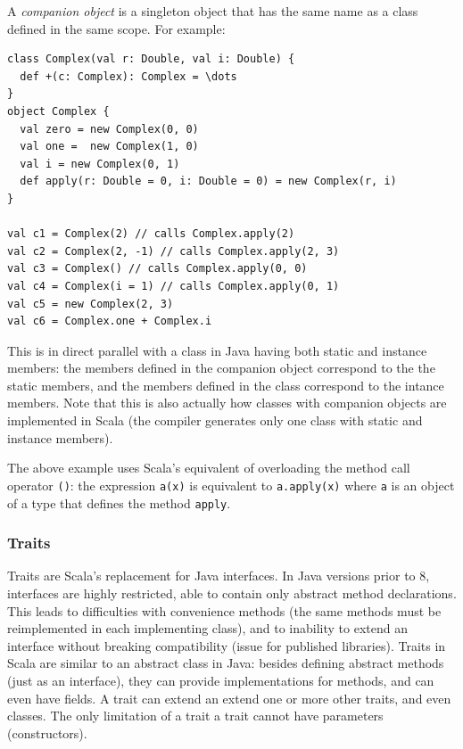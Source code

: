 A \emph{companion object} is a singleton object that has the same name as a class defined in the same scope. For example:

\begin{lstlisting}
class Complex(val r: Double, val i: Double) {
  def +(c: Complex): Complex = \dots
}
object Complex {
  val zero = new Complex(0, 0)
  val one =  new Complex(1, 0)
  val i = new Complex(0, 1)
  def apply(r: Double = 0, i: Double = 0) = new Complex(r, i)
}

val c1 = Complex(2) // calls Complex.apply(2)
val c2 = Complex(2, -1) // calls Complex.apply(2, 3)
val c3 = Complex() // calls Complex.apply(0, 0)
val c4 = Complex(i = 1) // calls Complex.apply(0, 1)
val c5 = new Complex(2, 3)
val c6 = Complex.one + Complex.i
\end{lstlisting}

This is in direct parallel with a class in Java having both static and instance members: the members defined in the companion object correspond to the the static members, and the members defined in the class correspond to the intance members. Note that this is also actually how classes with companion objects are implemented in Scala (the compiler generates only one class with static and instance members).

The above example uses Scala's equivalent of overloading the method call operator \texttt{()}: the expression \texttt{a(x)} is equivalent to \texttt{a.apply(x)} where \texttt{a} is an object of a type that defines the method \texttt{apply}.

\subsubsection{Traits}

Traits are Scala's replacement for Java interfaces. In Java versions prior to 8, interfaces are highly restricted, able to contain only abstract method declarations. This leads to difficulties with convenience methods (the same methods must be reimplemented in each implementing class), and to inability to extend an interface without breaking compatibility (issue for published libraries). Traits in Scala are similar to an abstract class in Java: besides defining abstract methods (just as an interface), they can provide implementations for methods, and can even have fields. A trait can extend an extend one or more other traits, and even classes. The only limitation of a trait a trait cannot have parameters (constructors).

